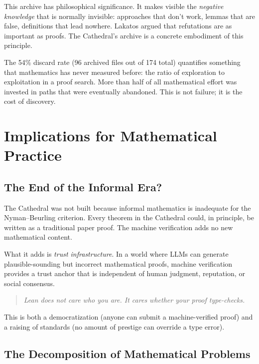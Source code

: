 \documentclass[11pt,a4paper]{article}
\begin{document}
This archive has philosophical significance. It makes visible the
\emph{negative knowledge} that is normally invisible: approaches that
don't work, lemmas that are false, definitions that lead nowhere.
Lakatos argued that refutations are as important as proofs. The
Cathedral's archive is a concrete embodiment of this principle.

The 54\% discard rate (96 archived files out of 174 total) quantifies
something that mathematics has never measured before: the ratio of
exploration to exploitation in a proof search. More than half of all
mathematical effort was invested in paths that were eventually
abandoned. This is not failure; it is the cost of discovery.

\section{Implications for Mathematical Practice}
\label{sec:practice}

\subsection{The End of the Informal Era?}

The Cathedral was not built because informal mathematics is inadequate
for the Nyman--Beurling criterion. Every theorem in the Cathedral
could, in principle, be written as a traditional paper proof. The
machine verification adds no new mathematical content.

What it adds is \emph{trust infrastructure}. In a world where
LLMs can generate plausible-sounding but incorrect mathematical
proofs, machine verification provides a trust anchor that is
independent of human judgment, reputation, or social consensus.

\begin{quote}
\emph{Lean does not care who you are. It cares whether your proof
type-checks.}
\end{quote}

This is both a democratization (anyone can submit a machine-verified
proof) and a raising of standards (no amount of prestige can override
a type error).

\subsection{The Decomposition of Mathematical Problems}
\end{document}
